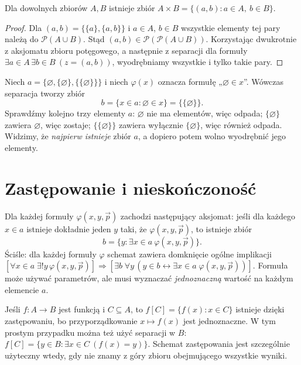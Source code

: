 \begin{twierdzenie}\label{thm:zf-product}
Dla dowolnych zbiorów $A,B$ istnieje zbiór
$A\times B=\{(a,b):a\in A,\ b\in B\}$.
\end{twierdzenie}
\begin{proof}
Dla $(a,b)=\{\{a\},\{a,b\}\}$ i $a\in A$, $b\in B$
wszystkie elementy tej pary należą do $\mathcal P(A\cup B)$.
Stąd $(a,b)\in\mathcal P(\mathcal P(A\cup B))$.
Korzystając dwukrotnie z aksjomatu zbioru potęgowego,
a następnie z separacji dla formuły
$\exists a\in A\,\exists b\in B\ (z=(a,b))$,
wyodrębniamy wszystkie i tylko takie pary.
\end{proof}


\begin{przyklad}
Niech $a=\{\varnothing,\{\varnothing\},\{\{\varnothing\}\}\}$
i niech $\varphi(x)$ oznacza formułę „$\varnothing\in x$”.
Wówczas separacja tworzy zbiór
\[
 b=\{x\in a:\varnothing\in x\}=\{\{\varnothing\}\}.
\]
Sprawdźmy kolejno trzy elementy $a$:
$\varnothing$ nie ma elementów, więc odpada;
$\{\varnothing\}$ zawiera $\varnothing$, więc zostaje;
$\{\{\varnothing\}\}$ zawiera wyłącznie $\{\varnothing\}$,
więc również odpada. Widzimy, że \emph{najpierw istnieje}
zbiór $a$, a dopiero potem wolno wyodrębnić jego elementy.
\end{przyklad}

\section{Zastępowanie i nieskończoność}
\begin{definicja}\label{def:zf-replacement}
Dla każdej formuły $\varphi(x,y,\vec p)$ zachodzi następujący
aksjomat: jeśli dla każdego $x\in a$ istnieje dokładnie jeden
$y$ taki, że $\varphi(x,y,\vec p)$, to istnieje zbiór
\[
 b=\{y:\exists x\in a\ \varphi(x,y,\vec p)\}.
\]
Ściśle: dla każdej formuły $\varphi$ schemat zawiera domknięcie ogólne
implikacji $[\forall x\in a\;\exists!y\,\varphi(x,y,\vec p)]\Rightarrow
[\exists b\;\forall y\,(y\in b\leftrightarrow\exists x\in a\;\varphi(x,y,\vec p))]$.
Formuła może używać parametrów, ale musi wyznaczać
\emph{jednoznaczną} wartość na każdym elemencie $a$.
\end{definicja}

\begin{przyklad}
Jeśli $f:A\to B$ jest funkcją i $C\subseteq A$, to
$f[C]=\{f(x):x\in C\}$ istnieje dzięki zastępowaniu,
bo przyporządkowanie $x\mapsto f(x)$ jest jednoznaczne.
W tym prostym przypadku można też użyć separacji w $B$:
$f[C]=\{y\in B:\exists x\in C\ (f(x)=y)\}$.
Schemat zastępowania jest szczególnie użyteczny wtedy,
gdy nie znamy z góry zbioru obejmującego wszystkie wyniki.
\end{przyklad}

